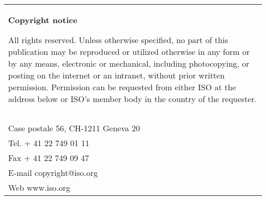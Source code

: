 \begin{tabular}{|p{\hsize}|}
\hline
\begin{center}
\textbf{Copyright notice}
\end{center}

\vspace{2ex}

All rights reserved. Unless otherwise specified,
no part of this publication may be reproduced or
utilized otherwise in any form or by any means,
electronic or mechanical, including photocopying,
or posting on the internet or an intranet,
without prior written permission.
Permission can be requested
from either ISO at the address below
or ISO's member body in the country of the requester.\\\\

\begin{minipage}{\hsize}
\begin{indented}
ISO copyright office\\
Case postale 56, CH-1211 Geneva 20\\
Tel. + 41 22 749 01 11\\
Fax + 41 22 749 09 47\\
E-mail copyright@iso.org\\
Web www.iso.org
\end{indented}
\end{minipage}

\hline
\end{tabular}

\newpage
